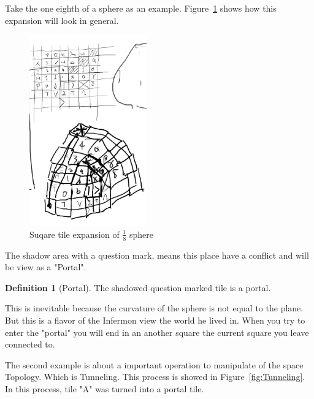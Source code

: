 \documentclass{article}
\theoremstyle{definition} %
\newtheorem{definition}{Definition}[section]
\begin{document}
Take the one eighth of a sphere as an example.
Figure~\ref{fig:sphere} shows how this expansion
will look in general.

\begin{figure}[!ht]
    \centering
    \includegraphics[width=0.45\textwidth]{figs/generalExplanation.png}
    \caption{Suqare tile expansion of $\frac{1}{8}$ sphere}
    \label{fig:sphere}
\end{figure}

The shadow area with a question mark,
means this place have a conflict and
will be view as a "Portal".

\begin{definition}[Portal]
    \label{def:Portal}
    The shadowed question marked tile
    is a portal.
\end{definition}

This is inevitable because the curvature
of the sphere is not equal to the plane.
But this is a flavor of the Infermon view
the world he lived in.
When you try to enter the "portal" you will end
in an another square the current square
you leave connected to.

The second example is about a important operation
to manipulate of the space Topology.
Which is Tunneling.
This process is showed in
Figure~\ref{fig:Tunneling}.
In this process, tile "A" was turned into a
portal tile.
\end{document}
